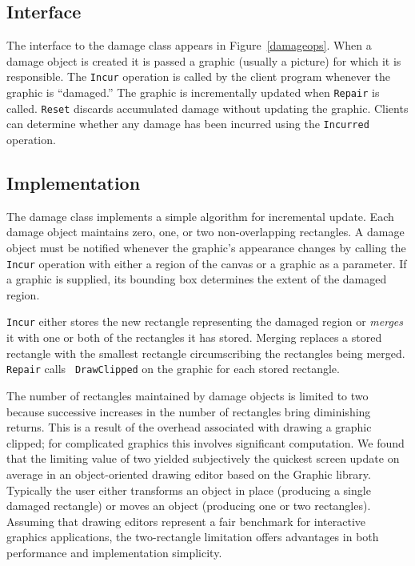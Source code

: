 \subsection{Interface}

The interface to the damage class appears in Figure~\ref{damageops}.
When a damage object is created it is passed a graphic (usually a picture)
for which it is responsible.  The {\tt Incur} operation
is called by the client program
whenever the graphic is ``damaged.''  The graphic is incrementally
updated when {\tt Repair} is called.  {\tt Reset} discards
accumulated damage without updating the graphic.
Clients can determine whether any damage has been incurred
using the {\tt Incurred} operation.

\subsection{Implementation}

The damage class implements a simple algorithm for incremental update.  Each
damage object maintains zero, one, or two non-overlapping rectangles. A
damage object must be notified whenever the graphic's appearance changes by
calling the {\tt Incur} operation with either a region of the canvas or a
graphic as a parameter.  If a graphic is supplied, its bounding box
determines the extent of the damaged region.  

{\tt Incur} either stores the new rectangle representing the damaged region
or {\em merges} it with one or both of the rectangles it has stored.
Merging replaces a stored rectangle with the smallest rectangle
circumscribing the rectangles being merged.  {\tt Repair} calls {\tt
DrawClipped} on the graphic for each stored rectangle.

The number of rectangles maintained by damage objects is limited to two
because successive increases in the number of rectangles bring diminishing
returns.  This is a result of the overhead associated with drawing a graphic
clipped; for complicated graphics this involves significant computation.  We
found that the limiting value of two yielded subjectively the quickest
screen update on average in an object-oriented drawing editor based on the
Graphic library.  Typically the user either transforms an object in place
(producing a single damaged rectangle) or moves an object (producing one or
two rectangles).  Assuming that drawing editors represent a fair benchmark
for interactive graphics applications, the two-rectangle limitation offers
advantages in both performance and implementation simplicity.

